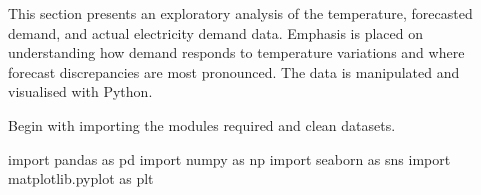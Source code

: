 \documentclass[mstat,12pt,a4paper]{unswthesis}
\newenvironment{Shaded}{\begin{snugshade}}{\end{snugshade}}
\newcommand{\ImportTok}[1]{#1}
\newcommand{\NormalTok}[1]{#1}
\begin{document}
This section presents an exploratory analysis of the temperature,
forecasted demand, and actual electricity demand data. Emphasis is
placed on understanding how demand responds to temperature variations
and where forecast discrepancies are most pronounced. The data is
manipulated and visualised with Python.

\bigskip

\noindent Begin with importing the modules required and clean datasets.

\begin{Shaded}
\begin{Highlighting}[]
\ImportTok{import}\NormalTok{ pandas }\ImportTok{as}\NormalTok{ pd}
\ImportTok{import}\NormalTok{ numpy }\ImportTok{as}\NormalTok{ np}
\ImportTok{import}\NormalTok{ seaborn }\ImportTok{as}\NormalTok{ sns}
\ImportTok{import}\NormalTok{ matplotlib.pyplot }\ImportTok{as}\NormalTok{ plt}
\end{Highlighting}
\end{Shaded}
\end{document}
